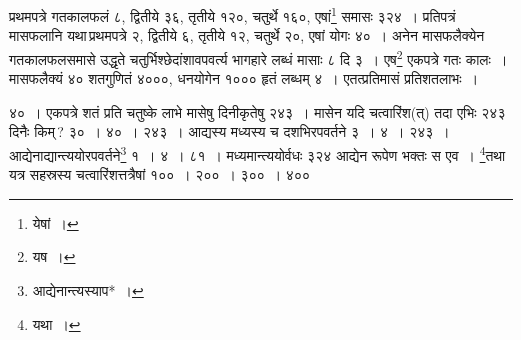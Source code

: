 \documentclass[10pt, openany]{book}
\begin{document}
{{{{प्रथमपत्रे गतकालफलं ८, द्वितीये ३६, तृतीये १२०, चतुर्थे १६०, एषां\renewcommand{\thefootnote}{\s ६}\footnote{\s येषां~।}
समासः}
{३२४~। प्रतिपत्रं मासफलानि यथा\textendash \,प्रथमपत्रे २, द्वितीये ६, तृतीये
१२, चतुर्थे २०, एषां}
{योगः ४०~। अनेन मासफलैक्येन गतकालफलसमासे उद्धृते
चतुर्भिश्छेदांशावपवर्त्य भागहारे लब्धं}
{मासाः ८ दि ३~। एष\renewcommand{\thefootnote}{\s ७}\footnote{\s यष~।} एकपत्रे गतः कालः~। मासफलैक्यं ४० शतगुणितं ४०००,
धनयोगेन}
{१००० हृतं लब्धम् ४~। एतत्प्रतिमासं प्रतिशतलाभः~।}

\vspace{0.3cm}{तथा च पृथक्पत्रेषु अद्य यावत् प्राप्तलाभपिण्डः प्रदर्शितः ३२४,
मासफलयोगः}
{४०~। एकपत्रे शतं प्रति चतुष्के लाभे मासेषु दिनीकृतेषु २४३~। मासेन यदि}
{चत्वारिंश(त्) तदा एभिः २४३ दिनैः किम्\,? ३०~। ४०~। २४३~। आद्यस्य मध्यस्य
च}
{दशभिरपवर्तने ३~। ४~। २४३~। आद्येनाद्यान्त्ययोरपवर्तने\renewcommand{\thefootnote}{\s ८}\footnote{\s आद्येनान्त्यस्याप*~।} १~। ४~। ८१~।
मध्यमान्त्ययोर्वधः}
{३२४ आद्येन रूपेण भक्तः स एव~। \renewcommand{\thefootnote}{\s ९}\footnote{\s यथा~।}तथा\textendash \,यत्र सहस्रस्य
चत्वारिंशत्तत्रैषां १००~। २००~। ३००~। ४०० }

\newpage

}}}
\end{document}
